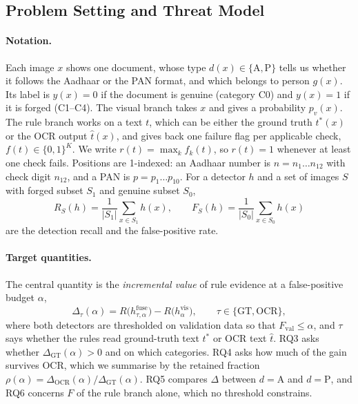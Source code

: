 \documentclass[VANCOUVER,Times1COL]{WileyNJDv5}
\begin{document}
\subsection{Problem Setting and Threat Model}
\label{subsec:problem}

\paragraph*{Notation.} Each image $x$ shows one document, whose type $d(x) \in \{\mathrm{A}, \mathrm{P}\}$ tells us whether it follows the Aadhaar or the PAN format, and which belongs to person $g(x)$. Its label is $y(x)=0$ if the document is genuine (category C0) and $y(x)=1$ if it is forged (C1--C4). The visual branch takes $x$ and gives a probability $p_v(x)$. The rule branch works on a text $t$, which can be either the ground truth $t^*(x)$ or the OCR output $\hat{t}(x)$, and gives back one failure flag per applicable check, $f(t) \in \{0,1\}^K$. We write $r(t) = \max_k f_k(t)$, so $r(t)=1$ whenever at least one check fails. Positions are 1-indexed: an Aadhaar
number is $n=n_1\dots n_{12}$ with check digit $n_{12}$, and a PAN is
$p=p_1\dots p_{10}$. For a detector $h$ and a set of images $S$ with
forged subset $S_1$ and genuine subset $S_0$,
\begin{equation}
\label{eq:rates}
R_S(h)=\frac{1}{|S_1|}\sum_{x\in S_1} h(x),\qquad
F_S(h)=\frac{1}{|S_0|}\sum_{x\in S_0} h(x)
\end{equation}
are the detection recall and the false-positive rate.

\paragraph*{Target quantities.} The central quantity is the
\emph{incremental value} of rule evidence at a false-positive budget
$\alpha$,
\begin{equation}
\label{eq:delta}
\Delta_{\tau}(\alpha) = R\big(h^{\mathrm{fuse}}_{\tau,\alpha}\big) - R\big(h^{\mathrm{vis}}_{\alpha}\big),
\qquad \tau\in\{\mathrm{GT},\mathrm{OCR}\},
\end{equation}
where both detectors are thresholded on validation data so that
$F_{\mathrm{val}}\le\alpha$, and $\tau$ says whether the rules read
ground-truth text $t^{\ast}$ or OCR text $\hat{t}$. RQ3 asks whether
$\Delta_{\mathrm{GT}}(\alpha)>0$
and on which categories. RQ4 asks how much of the gain survives OCR,
which we summarise by the retained fraction
$\rho(\alpha)=\Delta_{\mathrm{OCR}}(\alpha)/\Delta_{\mathrm{GT}}(\alpha)$. RQ5
compares $\Delta$ between $d=\mathrm{A}$ and $d=\mathrm{P}$, and RQ6
concerns $F$ of the rule branch alone, which no threshold constrains.
\end{document}
